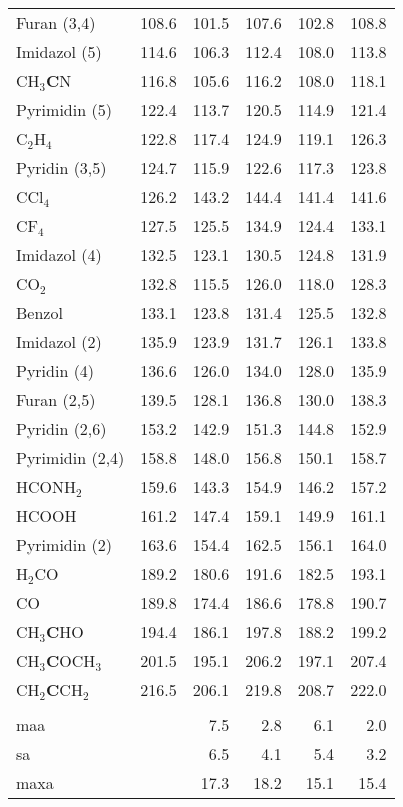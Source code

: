 \begin{table}[ht!]
{\begin{tabular}{lr|rr|rr}
    Furan (3,4) & 108.6 & 101.5 & 107.6 & 102.8 & 108.8 \\
    Imidazol (5) & 114.6 & 106.3 & 112.4 & 108.0 & 113.8 \\
    CH$_{3}$\textbf{C}N & 116.8 & 105.6 & 116.2 & 108.0 & 118.1 \\
    Pyrimidin (5) & 122.4 & 113.7 & 120.5 & 114.9 & 121.4 \\
    C$_{2}$H$_{4}$  & 122.8 & 117.4 & 124.9 & 119.1 & 126.3 \\
    Pyridin (3,5) & 124.7 & 115.9 & 122.6 & 117.3 & 123.8 \\
    CCl$_{4}$  & 126.2 & 143.2 & 144.4 & 141.4 & 141.6 \\
    CF$_{4}$   & 127.5 & 125.5 & 134.9 & 124.4 & 133.1 \\
    Imidazol (4) & 132.5 & 123.1 & 130.5 & 124.8 & 131.9 \\
    CO$_{2}$   & 132.8 & 115.5 & 126.0 & 118.0 & 128.3 \\
    Benzol & 133.1 & 123.8 & 131.4 & 125.5 & 132.8 \\
    Imidazol (2) & 135.9 & 123.9 & 131.7 & 126.1 & 133.8 \\
    Pyridin (4) & 136.6 & 126.0 & 134.0 & 128.0 & 135.9 \\
    Furan (2,5) & 139.5 & 128.1 & 136.8 & 130.0 & 138.3 \\
    Pyridin (2,6) & 153.2 & 142.9 & 151.3 & 144.8 & 152.9 \\
    Pyrimidin (2,4) & 158.8 & 148.0 & 156.8 & 150.1 & 158.7 \\
    HCONH$_{2}$ & 159.6 & 143.3 & 154.9 & 146.2 & 157.2 \\
    HCOOH & 161.2 & 147.4 & 159.1 & 149.9 & 161.1 \\
    Pyrimidin (2) & 163.6 & 154.4 & 162.5 & 156.1 & 164.0 \\
    H$_{2}$CO  & 189.2 & 180.6 & 191.6 & 182.5 & 193.1 \\
    CO    & 189.8 & 174.4 & 186.6 & 178.8 & 190.7 \\
    CH$_{3}$\textbf{C}HO & 194.4 & 186.1 & 197.8 & 188.2 & 199.2 \\
    CH$_{3}$\textbf{C}OCH$_{3}$ & 201.5 & 195.1 & 206.2 & 197.1 & 207.4 \\
    CH$_{2}$\textbf{C}CH$_{2}$ & 216.5 & 206.1 & 219.8 & 208.7 & 222.0 \\
          &       &       &       &       &  \\
    \ac{maa}   &       & 7.5   & 2.8   & 6.1   & 2.0 \\
    \ac{sa}   &       & 6.5   & 4.1   & 5.4   & 3.2 \\
    \ac{maxa}  &       & 17.3  & 18.2  & 15.1  & 15.4 \\
    \end{tabular}}%
  \label{tab:13cshifts}%
\end{table}%
\FloatBarrier

